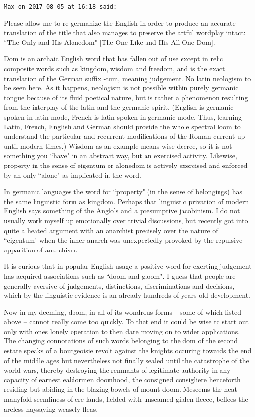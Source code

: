 \begin{footnotesize}\begin{sffamily}

\texttt{Max on 2017-08-05 at 16:18 said: }

Please allow me to re-germanize the English in order to produce an accurate translation of the title that also manages to preserve the artful wordplay intact: ``The Only and His Alonedom" [The One-Like and His All-One-Dom]. 

Dom is an archaic English word that has fallen out of use except in relic composite words such as kingdom, wisdom and freedom, and is the exact translation of the German suffix -tum, meaning judgement. No latin neologism to be seen here. As it happens, neologism is not possible within purely germanic tongue because of its fluid poetical nature, but is rather a phenomenon resulting from the interplay of the latin and the germanic spirit. (English is germanic spoken in latin mode, French is latin spoken in germanic mode. Thus, learning Latin, French, English and German should provide the whole spectral loom to understand the particular and recurrent modifications of the Roman current up until modern times.) Wisdom as an example means wise decree, so it is not something you ``have" in an abstract way, but an exercised activity. Likewise, property in the sense of eigentum or alonedom is actively exercised and enforced by an only ``alone" as implicated in the word.

In germanic languages the word for ``property" (in the sense of belongings) has the same linguistic form as kingdom. Perhaps that linguistic privation of modern English says something of the Anglo's and a presumptive jacobinism. I do not usually work myself up emotionally over trivial discussions, but recently got into quite a heated argument with an anarchist precisely over the nature of ``eigentum" when the inner anarch was unexpectedly provoked by the repulsive apparition of anarchism. 

It is curious that in popular English usage a positive word for exerting judgement has acquired associations such as ``doom and gloom". I guess that people are generally aversive of judgements, distinctions, discriminations and decisions, which by the linguistic evidence is an already hundreds of years old development. 

Now in my deeming, doom, in all of its wondrous forms – some of which listed above – cannot really come too quickly. To that end it could be wise to start out only with ones lonely operation to then dare moving on to wider applications. The changing connotations of such words belonging to the dom of the second estate speaks of a bourgeoisie revolt against the knights occuring towards the end of the middle ages but nevertheless not finally sealed until the catastrophe of the world wars, thereby destroying the remnants of legitimate authority in any capacity of earnest ealdormen doomhood, the consigned consigliere henceforth residing but abiding in the blazing bowels of mount doom. Meseems the neat manyfold seemliness of ere lands, fielded with unseamed gilden fleece, beflees the areless naysaying weasely fleas. 


\end{sffamily}
\end{footnotesize}
